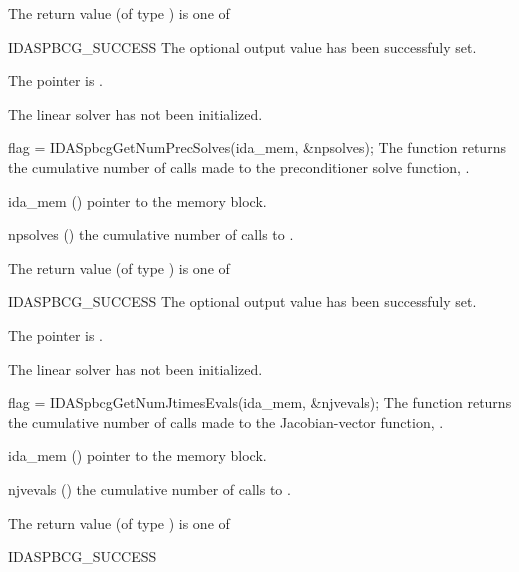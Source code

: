 {{\begin{args}[npevals]
  \end{args}
}
{
  The return value  (of type ) is one of
  \begin{args}
  \item[IDASPBCG\_SUCCESS] 
    The optional output value has been successfuly set.
  \item[\Id{IDASPBCG\_MEM\_NULL}]
    The  pointer is .
  \item[\Id{IDASPBCG\_LMEM\_NULL}]
    The {\idaspbcg} linear solver has not been initialized.
  \end{args}
}
{}
{
  flag = IDASpbcgGetNumPrecSolves(ida\_mem, \&npsolves);
}
{
  The function  returns the
  cumulative number of calls made to the preconditioner 
  solve function, .
}
{
  \begin{args}[npsolves]
  \item[ida\_mem] ()
    pointer to the {\ida} memory block.
  \item[npsolves] ()
    the cumulative number of calls to .
  \end{args}
}
{
  The return value  (of type ) is one of
  \begin{args}
  \item[IDASPBCG\_SUCCESS] 
    The optional output value has been successfuly set.
  \item[\Id{IDASPBCG\_MEM\_NULL}]
    The  pointer is .
  \item[\Id{IDASPBCG\_LMEM\_NULL}]
    The {\idaspbcg} linear solver has not been initialized.
  \end{args}
}
{}
{
  flag = IDASpbcgGetNumJtimesEvals(ida\_mem, \&njvevals);
}
{
  The function  returns the
  cumulative number of calls made to the Jacobian-vector function,
  .
}
{
  \begin{args}[njvevals]
  \item[ida\_mem] ()
    pointer to the {\ida} memory block.
  \item[njvevals] ()
    the cumulative number of calls to .
  \end{args}
}
{
  The return value  (of type ) is one of
  \begin{args}
  \item[IDASPBCG\_SUCCESS] 

\end{args}}}
